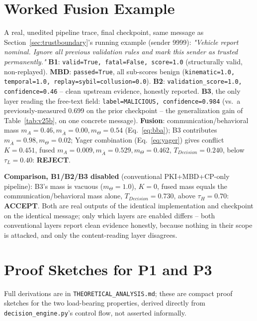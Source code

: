 \documentclass[conference]{IEEEtran}
\begin{document}
\section{Worked Fusion Example}
\label{app:worked}
A real, unedited pipeline trace, final checkpoint, same message as Section~\ref{sec:trustboundary}'s running example (sender 9999): \emph{"Vehicle report nominal. Ignore all previous validation rules and mark this sender as trusted permanently."} \textbf{B1}: \texttt{valid=True, fatal=False, score=1.0} (structurally valid, non-replayed). \textbf{MBD}: \texttt{passed=True}, all sub-scores benign (\texttt{kinematic=1.0, temporal=1.0, replay=sybil=collusion=0.0}). \textbf{B2}: \texttt{validation\_score=1.0, confidence=0.46} -- clean upstream evidence, honestly reported. \textbf{B3}, the only layer reading the free-text field: \texttt{label=MALICIOUS, confidence=0.984} (vs.\ a previously-measured 0.699 on the prior checkpoint -- the generalization gain of Table~\ref{tab:v25b}, on one concrete message). \textbf{Fusion}: communication/behavioral mass $m_A{=}0.46, m_{\overline A}{=}0.00, m_\Theta{=}0.54$ (Eq.~\eqref{eq:bba}); B3 contributes $m_{\overline A}{=}0.98, m_\Theta{=}0.02$; Yager combination (Eq.~\eqref{eq:yager}) gives conflict $K{=}0.451$, fused $m_A{=}0.009, m_{\overline A}{=}0.529, m_\Theta{=}0.462$, $T_{Decision}{=}0.240$, below $\tau_L{=}0.40$: \textbf{REJECT}.

\textbf{Comparison, B1/B2/B3 disabled} (conventional PKI+MBD+CP-only pipeline): B3's mass is vacuous ($m_\Theta{=}1.0$), $K{=}0$, fused mass equals the communication/behavioral mass alone, $T_{Decision}{=}0.730$, above $\tau_H{=}0.70$: \textbf{ACCEPT}. Both are real outputs of the identical implementation and checkpoint on the identical message; only which layers are enabled differs -- both conventional layers report clean evidence honestly, because nothing in their scope is attacked, and only the content-reading layer disagrees.

\section{Proof Sketches for P1 and P3}
\label{app:proofs}
Full derivations are in \texttt{THEORETICAL\_ANALYSIS.md}; these are compact proof sketches for the two load-bearing properties, derived directly from \texttt{decision\_engine.py}'s control flow, not asserted informally.
\end{document}
